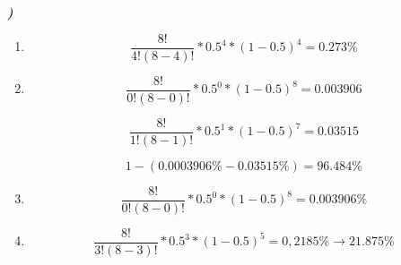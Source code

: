 \documentclass[12pt]{article}
\newcounter{instn}
\newcommand{\instnum}{\arabic{instn}}
\newcommand{\myline}[1]{
    \emph{\textbf{#1)}}
    \addtocounter{instn}{1}
}
\newenvironment{question}
 {
    \myline{\instnum} 
    }
    {
 }
\begin{document}
    \begin{question}
        
        \begin{enumerate}[label={\textbf{\alph*)}}]
            \item        
            \begin{equation}
                \frac{8!}{4!(8-4)!} * 0.5^{4}*(1-0.5)^{4} = 0.273\%
            \end{equation}
            \item 
            \[
                \frac{8!}{0!(8-0)!} * 0.5^{0}*(1-0.5)^{8} = 0.003906
            \]

            \[
                \frac{8!}{1!(8-1)!} * 0.5^{1}*(1-0.5)^{7} = 0.03515
            \]

            \begin{equation}
                1-(0.0003906\% - 0.03515\%) = 96.484\%
            \end{equation}

            \item  
            \begin{equation}
                \frac{8!}{0!(8-0)!} * 0.5^{0}*(1-0.5)^{8} = 0.003906\%
            \end{equation}

            \item  
            \begin{equation}
                \frac{8!}{3!(8-3)!} * 0.5^{3}*(1-0.5)^{5} = 0,2185\% \rightarrow 21.875\%
            \end{equation}
        \end{enumerate}
    \end{question}

\end{document}
